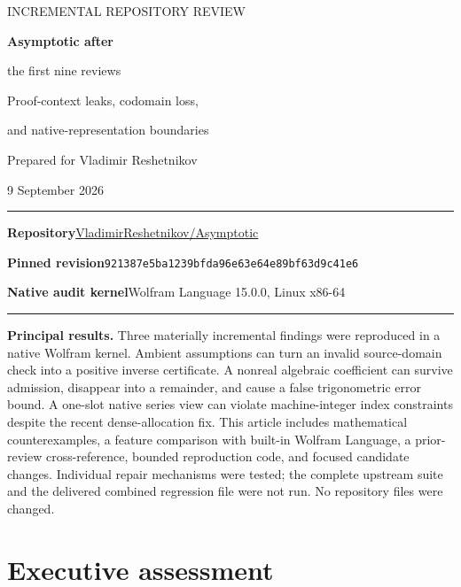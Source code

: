 \documentclass[11pt,a4paper]{article}
\newcommand{\commit}{\texttt{921387e5ba1239bfda96e63e64e89bf63d9c41e6}}
\begin{document}
\begin{titlepage}
\vspace*{11mm}
{\sffamily\color{accent}\Large INCREMENTAL REPOSITORY REVIEW\par}
\vspace{10mm}
{\sffamily\bfseries\color{ink}\fontsize{30}{35}\selectfont Asymptotic after\par the first nine reviews\par}
\vspace{7mm}
{\sffamily\fontsize{19}{25}\selectfont Proof-context leaks, codomain loss,\par and native-representation boundaries\par}
\vspace{13mm}
{\large Prepared for Vladimir Reshetnikov\par}
{\large 9 September 2026\par}
\vspace{12mm}\hrule\vspace{4mm}
\textbf{Repository}\quad\href{https://github.com/VladimirReshetnikov/Asymptotic}{VladimirReshetnikov/Asymptotic}\par
\textbf{Pinned revision}\quad\commit\par
\textbf{Native audit kernel}\quad Wolfram Language 15.0.0, Linux x86-64\par
\vspace{4mm}\hrule
\vspace{9mm}
\textbf{Principal results.} Three materially incremental findings were reproduced in a native Wolfram kernel. Ambient assumptions can turn an invalid source-domain check into a positive inverse certificate. A nonreal algebraic coefficient can survive admission, disappear into a remainder, and cause a false trigonometric error bound. A one-slot native series view can violate machine-integer index constraints despite the recent dense-allocation fix.
\vfill
\small This article includes mathematical counterexamples, a feature comparison with built-in Wolfram Language, a prior-review cross-reference, bounded reproduction code, and focused candidate changes. Individual repair mechanisms were tested; the complete upstream suite and the delivered combined regression file were not run. No repository files were changed.
\end{titlepage}
\begingroup\footnotesize\setlength{\parskip}{0pt}\tableofcontents\endgroup
\clearpage

\section{Executive assessment}
\end{document}
